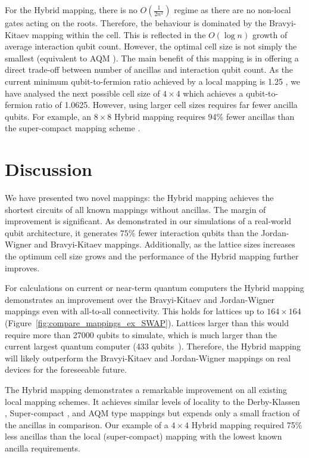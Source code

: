 \documentclass[pdftex,pra,aps,twocolumn,twoside]{revtex4-1}
\theoremstyle{plain}
\theoremstyle{note}
\newcommand\+{{\footnotesize \raisebox{0.3ex}{+}}}
\begin{document}
For the Hybrid\+ mapping, there is no $O(\frac{1}{2n^2})$ regime as there are no non-local gates acting on the roots. Therefore, the behaviour is dominated by the Bravyi-Kitaev mapping within the cell. This is reflected in the $O(\log n)$ growth of average interaction qubit count. However, the optimal cell size is not simply the smallest (equivalent to AQM \cite{steudtner2019quantum}). The main benefit of this mapping is in offering a direct trade-off between number of ancillas and interaction qubit count. As the current minimum qubit-to-fermion ratio achieved by a local mapping is 1.25 \cite{chen2022equivalence}, we have analysed the next possible cell size of $4 \times 4$ which achieves a qubit-to-fermion ratio of 1.0625. However, using larger cell sizes requires far fewer ancilla qubits. For example, an $8 \times 8$ Hybrid\+ mapping requires 94\% fewer ancillas than the super-compact mapping scheme \cite{chen2022equivalence}.

\section{Discussion}
We have presented two novel mappings: the Hybrid mapping achieves the shortest circuits of all known mappings without ancillas. The margin of improvement is significant. As demonstrated in our simulations of a real-world qubit architecture, it generates $75\%$ fewer interaction qubits than the Jordan-Wigner and Bravyi-Kitaev mappings. Additionally, as the lattice sizes increases the optimum cell size grows and the performance of the Hybrid mapping further improves.

For calculations on current or near-term quantum computers the Hybrid mapping demonstrates an improvement over the Bravyi-Kitaev and Jordan-Wigner mappings even with all-to-all connectivity. This holds for lattices up to $164 \times 164$ (Figure~\ref{fig:compare_mappings_ex_SWAP}). Lattices larger than this would require more than 27000 qubits to simulate, which is much larger than the current largest quantum computer (433 qubits~\cite{gambetta2020ibm}). Therefore, the Hybrid mapping will likely outperform the Bravyi-Kitaev and Jordan-Wigner mappings on real devices for the foreseeable future.

The Hybrid\+ mapping demonstrates a remarkable improvement on all existing local mapping schemes. It achieves similar levels of locality to the Derby-Klassen \cite{derby2021compact}, Super-compact \cite{chen2022equivalence}, and  AQM \cite{steudtner2019quantum} type mappings but expends only a small fraction of the ancillas in comparison. Our example of a $4 \times 4$ Hybrid\+ mapping required 75\% less ancillas than the local (super-compact) mapping with the lowest known ancilla requirements.
\end{document}
